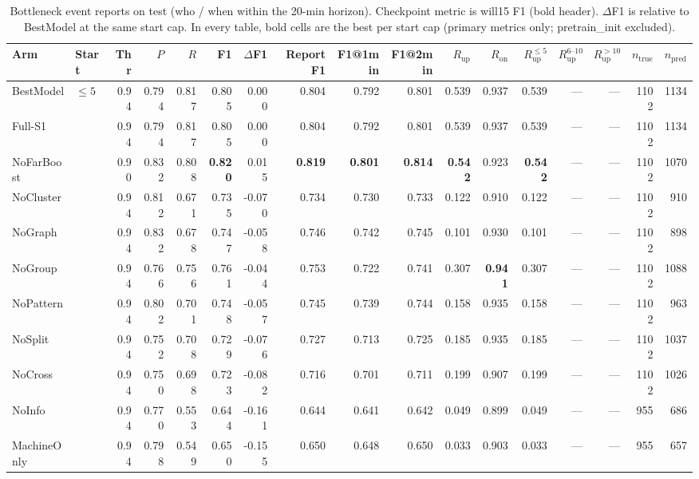\documentclass[9pt,a4paper,twocolumn]{extarticle}
\begin{document}
\begin{table}[tp]
\centering\scriptsize\setlength{\tabcolsep}{3.2pt}
\caption{Bottleneck event reports on test (who / when within the 20-min horizon). Checkpoint metric is will15 F1 (bold header). $\Delta$F1 is relative to BestModel at the same start cap. In every table, bold cells are the best per start cap (primary metrics only; pretrain\_init excluded).}
\begin{tabular}{llrrrrrrrrrrrrrrr}
\toprule
Arm & Start & Thr & $P$ & $R$ & \textbf{F1} & $\Delta$F1 & Report F1 & F1@1min & F1@2min & $R_{\mathrm{up}}$ & $R_{\mathrm{on}}$ & $R_{\mathrm{up}}^{\le5}$ & $R_{\mathrm{up}}^{6\text{--}10}$ & $R_{\mathrm{up}}^{>10}$ & $n_{\mathrm{true}}$ & $n_{\mathrm{pred}}$ \\
\midrule
BestModel & $\le 5$ & 0.94 & 0.794 & 0.817 & 0.805 & 0.000 & 0.804 & 0.792 & 0.801 & 0.539 & 0.937 & 0.539 & --- & --- & 1102 & 1134 \\
Full-S1 &  & 0.94 & 0.794 & 0.817 & 0.805 & 0.000 & 0.804 & 0.792 & 0.801 & 0.539 & 0.937 & 0.539 & --- & --- & 1102 & 1134 \\
NoFarBoost &  & 0.90 & 0.832 & 0.808 & \textbf{0.820} & 0.015 & \textbf{0.819} & \textbf{0.801} & \textbf{0.814} & \textbf{0.542} & 0.923 & \textbf{0.542} & --- & --- & 1102 & 1070 \\
NoCluster &  & 0.94 & 0.812 & 0.671 & 0.735 & -0.070 & 0.734 & 0.730 & 0.733 & 0.122 & 0.910 & 0.122 & --- & --- & 1102 & 910 \\
NoGraph &  & 0.94 & 0.832 & 0.678 & 0.747 & -0.058 & 0.746 & 0.742 & 0.745 & 0.101 & 0.930 & 0.101 & --- & --- & 1102 & 898 \\
NoGroup &  & 0.94 & 0.766 & 0.756 & 0.761 & -0.044 & 0.753 & 0.722 & 0.741 & 0.307 & \textbf{0.941} & 0.307 & --- & --- & 1102 & 1088 \\
NoPattern &  & 0.94 & 0.802 & 0.701 & 0.748 & -0.057 & 0.745 & 0.739 & 0.744 & 0.158 & 0.935 & 0.158 & --- & --- & 1102 & 963 \\
NoSplit &  & 0.94 & 0.752 & 0.708 & 0.729 & -0.076 & 0.727 & 0.713 & 0.725 & 0.185 & 0.935 & 0.185 & --- & --- & 1102 & 1037 \\
NoCross &  & 0.94 & 0.750 & 0.698 & 0.723 & -0.082 & 0.716 & 0.701 & 0.711 & 0.199 & 0.907 & 0.199 & --- & --- & 1102 & 1026 \\
NoInfo &  & 0.94 & 0.770 & 0.553 & 0.644 & -0.161 & 0.644 & 0.641 & 0.642 & 0.049 & 0.899 & 0.049 & --- & --- & 955 & 686 \\
MachineOnly &  & 0.94 & 0.798 & 0.549 & 0.650 & -0.155 & 0.650 & 0.648 & 0.650 & 0.033 & 0.903 & 0.033 & --- & --- & 955 & 657 \\

\end{tabular}
\end{table}
\end{document}
